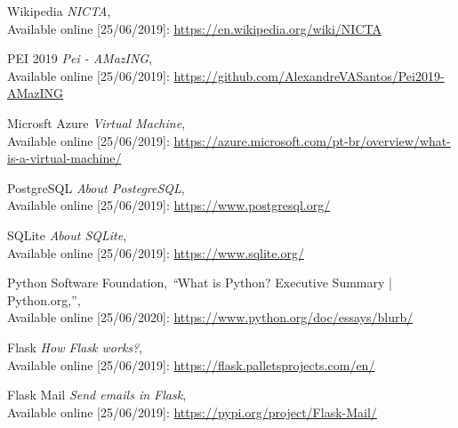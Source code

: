 \begin{thebibliography}{9}
    \vspace{-0.2cm}

    Wikipedia
    \textit{NICTA}, \\
    Available online [25/06/2019]:
    \url{https://en.wikipedia.org/wiki/NICTA} \\
    \vspace{-0.5cm}
    
    PEI 2019
    \textit{Pei - AMazING}, \\
    Available online [25/06/2019]:
    \url{https://github.com/AlexandreVASantos/Pei2019-AMazING} \\
    \vspace{-0.5cm}

    Microsft Azure
    \textit{Virtual Machine}, \\
    Available online [25/06/2019]:  
    \url{https://azure.microsoft.com/pt-br/overview/what-is-a-virtual-machine/} \\
    \vspace{-0.5cm}

    PostgreSQL
    \textit{About PostegreSQL}, \\
    Available online [25/06/2019]:  
    \url{https://www.postgresql.org/} \\
    \vspace{-0.5cm}
    
    SQLite
    \textit{About SQLite}, \\
    Available online [25/06/2019]:
    \url{https://www.sqlite.org/} \\
    \vspace{-0.5cm}
    
    Python Software Foundation,
    \textit“What is Python? Executive Summary | Python.org,”,\\
    Available online [25/06/2020]:
    \url{https://www.python.org/doc/essays/blurb/}\\
    \vspace{-0.5cm}

    Flask
    \textit{How Flask works?}, \\
    Available online [25/06/2019]:
    \url{https://flask.palletsprojects.com/en/} \\
    \vspace{-0.5cm}
    
    Flask Mail
    \textit{Send emails in Flask}, \\
    Available online [25/06/2019]:
    \url{https://pypi.org/project/Flask-Mail/} \\
    \vspace{-0.5cm}
    

\end{thebibliography}
